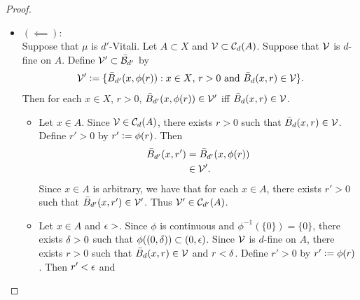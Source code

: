 \documentclass{book}
\begin{document}
\begin{proof}
\begin{itemize}
\begin{itemize}
\begin{itemize}
\begin{align*}
						\bar{B}_{d'}(x, \phi(r)) \in \MF'
						& \iff \bar{B}_d(x,r) \in \MF \\
						& \implies \bar{B}_d(x,r) \in \MV \\
						& \iff \bar{B}_{d'}(x, \phi(r)) \in \MV' \quad \text{(by definition of $\MV$),}
					\end{align*}
					we have that $\MF' \subset \MV'$.
					\item Since $\MF$ is countable and $\MF = \MF'$, we have that $\MF'$ is countable. 
					\item Since $\MF$ is disjoint and $\MF = \MF'$, we have that $\MF'$ is disjoint.
					\item Since $\MF$ $\mu^*$-covers $A$ and $\MF = \MF'$, we have that $\MF'$ $\mu^*$-covers $A$.
				\end{itemize}
			\end{itemize}
			Since $A \subset X$ and $\MV' \subset \MC_{d'}(A)$ such that $\MV'$ is $d'$-fine on $A$ are arbitrary, we have that for each $A \subset X$ and $\MV' \subset \MC_{d'}(A)$, $\MV'$ is $d'$-fine on $A$ implies that there exists $\MF' \subset \MV'$ such that $\MF'$ is countable, $\MF'$ is disjoint and $\MF'$ $\mu^*$-covers $A$. Hence $\mu$ is $d'$-Vitali.
			\item $(\impliedby)$: \\
			Suppose that $\mu$ is $d'$-Vitali. Let $A \subset X$ and $\mathcal{V} \subset \mathcal{C}_d(A)$. Suppose that $\mathcal{V}$ is $d$-fine on $A$. Define $\mathcal{V}' \subset \bar{\mathcal{B}}_{d'}$ by 
			$$\mathcal{V}' \vcentcolon= \{\bar{B}_{d'}(x, \phi(r)): \text{$x \in X$, $r >0$ and $\bar{B}_d(x, r) \in \mathcal{V}$}\}.$$ 
			Then for each $x \in X$, $r > 0$, $\bar{B}_{d'}(x, \phi(r)) \in \mathcal{V}'$ iff $\bar{B}_d(x, r) \in \mathcal{V}$.
			\begin{itemize}
				\item Let $x \in A$. Since $\mathcal{V} \in \mathcal{C}_d(A)$, there exists $r > 0$ such that $\bar{B}_d(x, r) \in \mathcal{V}$. Define $r' > 0$ by $r' \vcentcolon= \phi(r)$. Then 
				\begin{align*}
					\bar{B}_{d'}(x, r')
					& = \bar{B}_{d'}(x, \phi(r)) \\
					& \in \mathcal{V}'.
				\end{align*}
				Since $x \in A$ is arbitrary, we have that for each $x \in A$, there exists $r' > 0$ such that $\bar{B}_{d'}(x, r') \in \mathcal{V}'$. Thus $\mathcal{V}' \in \mathcal{C}_{d'}(A)$.
				\item Let $x \in A$ and $\epsilon >$. Since $\phi$ is continuous and $\phi^{-1}(\{0\}) = \{0\}$, there exists $\delta > 0$ such that $\phi((0, \delta)) \subset (0,\epsilon)$. Since $\mathcal{V}$ is $d$-fine on $A$, there exists $r > 0$ such that $\bar{B}_d(x, r) \in \mathcal{V}$ and $r < \delta$. Define $r' > 0$ by $r' \vcentcolon= \phi(r)$. Then $r' < \epsilon$ and  

\end{itemize}
\end{itemize}
\end{proof}
\end{document}
